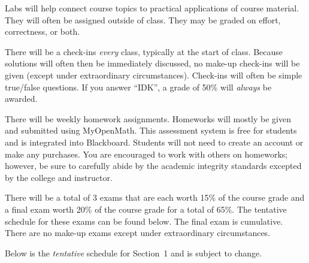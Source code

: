 \documentclass[11pt,letterpaper]{article}
\begin{document}
Labs will help connect course topics to practical applications of course material. They will often be assigned outside of class. They may be graded on effort, correctness, or both. \par\vspace{0.3cm} 



There will be a check-ins \textit{every} class, typically at the start of class. Because solutions will often then be immediately discussed, no make-up check-ins will be given (except under extraordinary circumstances). Check-ins will often be simple true/false questions. If you answer ``IDK'', a grade of 50\% will \textit{always} be awarded. \par\vspace{0.3cm}


There will be weekly homework assignments. Homeworks will mostly be given and submitted using MyOpenMath. This assessment system is free for students and is integrated into Blackboard. Students will not need to create an account or make any purchases. You are encouraged to work with others on homeworks; however, be sure to carefully abide by the academic integrity standards excepted by the college and instructor. \par\vspace{0.3cm}


There will be a total of 3 exams that are each worth 15\% of the course grade and a final exam worth 20\% of the course grade for a total of 65\%. The tentative schedule for these exams can be found below. The final exam is cumulative. There are no make-up exams except under extraordinary circumstances. \par\vspace{0.3cm}


Below is the \emph{tentative} schedule for Section~1 and is subject to change. 
\end{document}
